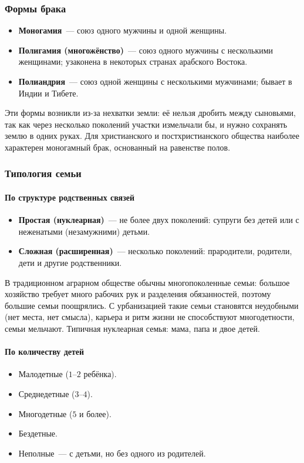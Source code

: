 \documentclass[12pt]{article}
\begin{document}
	\subsubsection{Формы брака}

	\begin{itemize}
		\item \textbf{Моногамия}~--- союз одного мужчины и одной женщины.
		\item \textbf{Полигамия (многожёнство)}~--- союз одного мужчины с несколькими женщинами; узаконена в некоторых странах арабского Востока.
		\item \textbf{Полиандрия}~--- союз одной женщины с несколькими мужчинами; бывает в Индии и Тибете.
	\end{itemize}

	\begin{note}
		Эти формы возникли из-за нехватки земли: её нельзя дробить между сыновьями, так как через несколько поколений участки измельчали бы, и нужно сохранять землю в одних руках. Для христианского и постхристианского общества наиболее характерен моногамный брак, основанный на равенстве полов.
	\end{note}

	\subsubsection{Типология семьи}

	\paragraph{По структуре родственных связей}
	\begin{itemize}
		\item \textbf{Простая (нуклеарная)}~--- не более двух поколений: супруги без детей или с неженатыми (незамужними) детьми.
		\item \textbf{Сложная (расширенная)}~--- несколько поколений: прародители, родители, дети и другие родственники.
	\end{itemize}

	В традиционном аграрном обществе обычны многопоколенные семьи: большое хозяйство требует много рабочих рук и разделения обязанностей, поэтому большие семьи поощрялись. С урбанизацией такие семьи становятся неудобными (нет места, нет смысла), карьера и ритм жизни не способствуют многодетности, семьи мельчают. Типичная нуклеарная семья: мама, папа и двое детей.

	\paragraph{По количеству детей}
	\begin{itemize}
		\item Малодетные ($1$--$2$ ребёнка).
		\item Среднедетные ($3$--$4$).
		\item Многодетные ($5$ и более).
		\item Бездетные.
		\item Неполные~--- с детьми, но без одного из родителей.
	\end{itemize}
\end{document}
